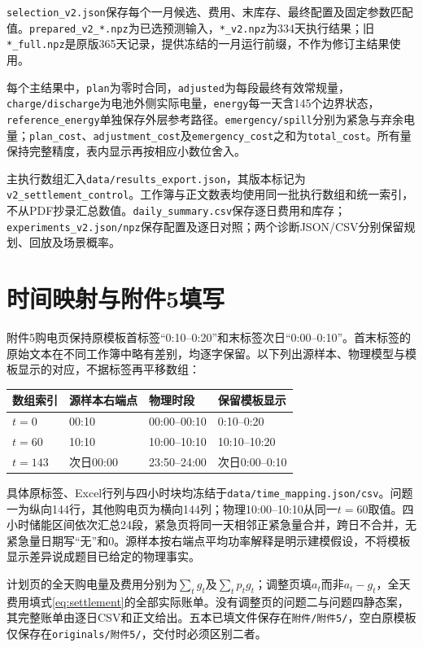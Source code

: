 \texttt{selection\_v2.json}保存每个一月候选、费用、末库存、最终配置及固定参数匹配值。\texttt{prepared\_v2\_*.npz}为已选预测输入，\texttt{*\_v2.npz}为334天执行结果；旧\texttt{*\_full.npz}是原版365天记录，提供冻结的一月运行前缀，不作为修订主结果使用。

每个主结果中，\texttt{plan}为零时合同，\texttt{adjusted}为每段最终有效常规量，\texttt{charge/discharge}为电池外侧实际电量，\texttt{energy}每一天含145个边界状态，\texttt{reference\_energy}单独保存外层参考路径。\texttt{emergency/spill}分别为紧急与弃余电量；\texttt{plan\_cost}、\texttt{adjustment\_cost}及\texttt{emergency\_cost}之和为\texttt{total\_cost}。所有量保持完整精度，表内显示再按相应小数位舍入。

主执行数组汇入\texttt{data/results\_export.json}，其版本标记为\texttt{v2\_settlement\_control}。工作簿与正文数表均使用同一批执行数组和统一索引，不从PDF抄录汇总数值。\texttt{daily\_summary.csv}保存逐日费用和库存；\texttt{experiments\_v2.json/npz}保存配置及逐日对照；两个诊断JSON/CSV分别保留规划、回放及场景概率。

\section{时间映射与附件5填写}

附件5购电页保持原模板首标签“0:10--0:20”和末标签次日“0:00--0:10”。首末标签的原始文本在不同工作簿中略有差别，均逐字保留。以下列出源样本、物理模型与模板显示的对应，不据标签再平移数组：

\begin{center}\small
\begin{tabular}{llll}\toprule
数组索引 & 源样本右端点 & 物理时段 & 保留模板显示\\\midrule
$t=0$ & 00:10 & 00:00--00:10 & 0:10--0:20\\
$t=60$ & 10:10 & 10:00--10:10 & 10:10--10:20\\
$t=143$ & 次日00:00 & 23:50--24:00 & 次日0:00--0:10\\
\bottomrule\end{tabular}
\end{center}

具体原标签、Excel行列与四小时块均冻结于\texttt{data/time\_mapping.json/csv}。问题一为纵向144行，其他购电页为横向144列；物理10:00--10:10从同一$t=60$取值。四小时储能区间依次汇总24段，紧急页将同一天相邻正紧急量合并，跨日不合并，无紧急量日期写“无”和0。源样本按右端点平均功率解释是明示建模假设，不将模板显示差异说成题目已给定的物理事实。

计划页的全天购电量及费用分别为$\sum_tg_t$及$\sum_tp_tg_t$；调整页填$a_t$而非$a_t-g_t$，全天费用填式\eqref{eq:settlement}的全部实际账单。没有调整页的问题二与问题四静态案，其完整账单由逐日CSV和正文给出。五本已填文件保存在\texttt{附件/附件5/}，空白原模板仅保存在\texttt{originals/附件5/}，交付时必须区别二者。

